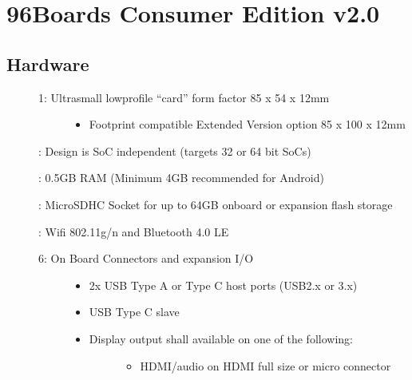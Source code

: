 \documentclass[a4paper,10pt,oneside,english]{sphinxmanual}
\begin{document}
\chapter{96Boards Consumer Edition v2.0}
\label{\detokenize{chapter1-ce:boards-consumer-edition-v2-0}}

\section{Hardware}
\label{\detokenize{chapter1-ce:hardware}}\begin{description}
\item[{}] \leavevmode\begin{description}
\item[{1: Ultra\sphinxhyphen{}small low\sphinxhyphen{}profile “card” form factor \sphinxhyphen{} 85 x 54 x 12mm}] \leavevmode\begin{itemize}
\item {} 
\sphinxAtStartPar
Footprint compatible Extended Version option \sphinxhyphen{} 85 x 100 x 12mm

\end{itemize}

\end{description}

: Design is SoC independent (targets 32 or 64 bit SoCs)

: 0.5GB RAM (Minimum 4GB recommended for Android)

: MicroSDHC Socket for up to 64GB on\sphinxhyphen{}board or expansion flash storage

: Wifi 802.11g/n and Bluetooth 4.0 LE
\begin{description}
\item[{6: On Board Connectors and expansion I/O}] \leavevmode\begin{itemize}
\item {} 
\sphinxAtStartPar
2x USB Type A or Type C host ports (USB2.x or 3.x)

\item {} 
\sphinxAtStartPar
USB Type C slave

\item {} \begin{description}
\item[{Display output shall available on one of the following:}] \leavevmode\begin{itemize}
\item {} 
\sphinxAtStartPar
HDMI/audio on HDMI full size or micro connector


\end{itemize}
\end{description}
\end{itemize}
\end{description}
\end{description}
\end{document}
